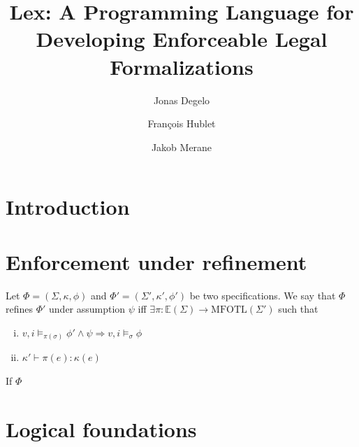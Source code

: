 \documentclass[runningheads]{llncs}
\begin{document}
\title{Lex: A Programming Language for Developing Enforceable Legal Formalizations}

\author{Jonas Degelo \and François Hublet \and Jakob Merane}



\maketitle

\begin{abstract}
\end{abstract}
%

%
\iffalse
\section{Introduction}


\section{Enforcement under refinement}

\newcommand{\Events}[1]{\mathbb{E}(#1)}
\newcommand{\Pow}[1]{\mathcal{P}(#1)}

\begin{definition}
  Let $\Phi=(\Sigma, \kappa, \phi)$ and $\Phi'=(\Sigma',\kappa',\phi')$ be two specifications. We say that $\Phi$ refines $\Phi'$ under assumption $\psi$ iff $\exists \pi: \Events{\Sigma} \to \mathrm{MFOTL}(\Sigma')$ such that
  \begin{enumerate}[(i)]
  \item  $v, i\vDash_{\pi(\sigma)} \phi' \land \psi \Longrightarrow v, i\vDash_{\sigma} \phi$
  \item $\kappa' \vdash \pi(e) : \kappa(e)$
  \end{enumerate}
\end{definition}

\begin{theorem}
If $\Phi$ 
\end{theorem}

\section{Logical foundations}
\end{document}
